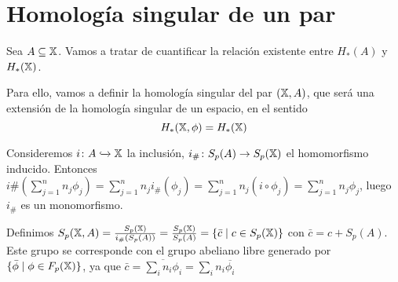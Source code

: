 \section{Homología singular de un par}

Sea $A \subseteq {\mathbb X}$. Vamos a tratar de cuantificar la relación existente entre $H_*(A)$ y $H_*({\mathbb X})$.

Para ello, vamos a definir la homología singular del par $({\mathbb X}, A)$, que será una extensión de la homología singular de un espacio, en el sentido
\[H_*({\mathbb X}, \phi) = H_*({\mathbb X})\]

Consideremos $i \colon A \xhookrightarrow{} {\mathbb X}$ la inclusión, $i_\# \colon S_p(A) \to S_{p}({\mathbb X})$ el homomorfismo inducido.
Entonces $i\#(\sum\limits_{j = 1}^n n_j \phi_j) = \sum\limits_{j = 1}^n n_j i_\#(\phi_j) = \sum\limits_{j = 1}^n n_j (i \circ \phi_j) = \sum\limits_{j = 1}^n n_j \phi_j$,
luego $i_\#$ es un monomorfismo.

Definimos $S_p({\mathbb X}, A) = \frac{S_{p}({\mathbb X})}{i_\#(S_p(A))} = \frac{S_{p}({\mathbb X})}{S_p(A)} = \{\bar{c} \mid c \in S_{p}({\mathbb X}) \}$ con $\bar{c} = c + S_p(A)$.
Este grupo se corresponde con el grupo abeliano libre generado por $\{\bar{\phi} \mid \phi \in F_{p}({\mathbb X})\}$, ya que
$\bar{c} = \overline{\sum_i n_i \phi_i} = \sum_i n_i \overline{\phi_i} $
